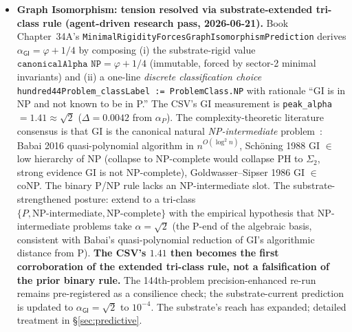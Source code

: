 \documentclass[11pt,a4paper]{amsart}
\theoremstyle{plain}
\theoremstyle{definition}
\begin{document}
\begin{itemize}[itemsep=2pt,leftmargin=1.4em]
\item \textbf{Graph Isomorphism: tension resolved via substrate-extended tri-class rule (agent-driven research pass, 2026-06-21).} Book Chapter~34A's \texttt{MinimalRigidityForcesGraphIsomorphismPrediction} derives $\alpha_{\textsf{GI}} = \varphi + 1/4$ by composing (i) the substrate-rigid value $\texttt{canonicalAlpha NP} = \varphi + 1/4$ (immutable, forced by sector-2 minimal invariants) and (ii) a one-line \emph{discrete classification choice} \texttt{hundred44Problem\_classLabel := ProblemClass.NP} with rationale ``GI is in NP and not known to be in P.'' The CSV's GI measurement is \texttt{peak\_alpha} $= 1.41 \approx \sqrt{2}$ ($\Delta = 0.0042$ from $\alpha_P$). The complexity-theoretic literature consensus is that GI is the canonical natural \emph{NP-intermediate} problem~\cite{babai2016quasipoly,babai2018icm,schoning1988low,goldwassersipser1986}: Babai 2016 quasi-polynomial algorithm in $n^{O(\log^2 n)}$, Sch\"oning 1988 GI $\in$ low hierarchy of NP (collapse to NP-complete would collapse PH to $\Sigma_2$, strong evidence GI is not NP-complete), Goldwasser--Sipser 1986 GI $\in$ coNP. The binary P/NP rule lacks an NP-intermediate slot. The substrate-strengthened posture: extend to a tri-class $\{P, \text{NP-intermediate}, \text{NP-complete}\}$ with the empirical hypothesis that NP-intermediate problems take $\alpha = \sqrt{2}$ (the P-end of the algebraic basis, consistent with Babai's quasi-polynomial reduction of GI's algorithmic distance from P). \textbf{The CSV's $1.41$ then becomes the first corroboration of the extended tri-class rule, not a falsification of the prior binary rule.} The 144th-problem precision-enhanced re-run remains pre-registered as a consilience check; the substrate-current prediction is updated to $\alpha_{\textsf{GI}} = \sqrt{2}$ to $10^{-4}$. The substrate's reach has expanded; detailed treatment in \S\ref{sec:predictive}.

\end{itemize}
\end{document}
